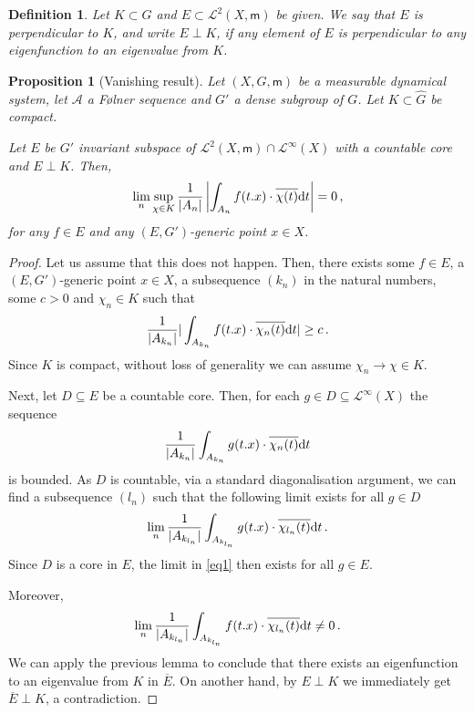 \documentclass [14pt]{amsart}
\numberwithin{equation}{section}
\newcommand{\cL}{{\mathcal L}}
\newcommand{\cA}{{\mathcal A}}
\newcommand{\mm}{\mathsf{m}}
\newcommand{\dd}{\mbox{\rm d}}
\newtheorem{prop}[theorem]{Proposition}
\newtheorem{definition}[theorem]{Definition}
\begin{document}
\begin{definition}
Let $K\subset \widehat{G}$ and $E\subset \mathcal{L}^2 (X, \mm)$ be given. We say that $E$ is {\rm perpendicular} to $K$, and write $E\perp K$, if  any element of $E$ is perpendicular to any eigenfunction to an eigenvalue from $K$.
\end{definition}



\begin{prop}[Vanishing result] \label{uniform-vanishing} Let $(X,G,  \mm)$ be a measurable dynamical system, let $\cA$ a F\o lner sequence and $G'$ a dense subgroup of $G$. Let $K\subset \widehat{G}$ be compact.

Let $E$ be  $G'$ invariant subspace of $\mathcal{L}^2 (X, \mm) \cap \mathcal{L}^\infty (X)$ with  a countable core and  $E\perp K$. Then,
\[
\lim_n \sup_{\chi \in K} \frac{1}{|A_n|} \left| \int_{A_n} f(t.x) \cdot \overline{\chi(t)} \dd t\right| = 0 \,,
\]
for any $f \in E$ and any $(E,G')$-generic point $x\in X$.
\end{prop}
\begin{proof} Let us assume that this does not happen. Then, there exists some $f \in E$, a $(E,G')$-generic point $x\in X$, a subsequence $(k_n)$ in the natural numbers, some $c>0$ and $\chi_n \in K$ such that
\[
\frac{1}{|A_{k_n}|} |\int_{A_{k_n}} f(t.x) \cdot \overline{\chi_n(t)} \dd t| \geq  c \, .
\]
Since $K$ is compact, without loss of generality we can assume $\chi_n \to \chi \in K$.

Next, let $D \subseteq E$ be a countable core. Then, for each $g \in D \subseteq \cL^\infty(X)$ the sequence
\[
\frac{1}{|A_{k_n}|} \int_{A_{k_n}} g(t.x)\cdot \overline{\chi_n(t)} \dd t
\]
is bounded. As $D$ is countable, via a standard diagonalisation argument, we can find a subsequence $(l_n)$ such that the following limit exists for all $g \in D$
\begin{equation}\label{eq1}
\lim_n \frac{1}{|A_{k_{l_n}}|} \int_{A_{k_{l_n}}} g(t.x) \cdot \overline{\chi_{l_n}(t)} \dd t \,.
\end{equation}
Since $D$ is a core in $E$, the limit in \eqref{eq1} then exists for all $g \in E$.

Moreover,
\[
\lim_n \frac{1}{|A_{k_{l_n}}|} \int_{A_{k_{l_n}}} f(t.x) \cdot \overline{\chi_{l_n}(t)} \dd t  \neq 0 \,.
\]
We can apply the previous lemma to conclude that there exists an eigenfunction to an eigenvalue from $K$ in $\overline{E}$. On another hand, by $E \perp K$ we immediately get  $\overline{E} \perp K$, a contradiction.
\end{proof}
\end{document}
